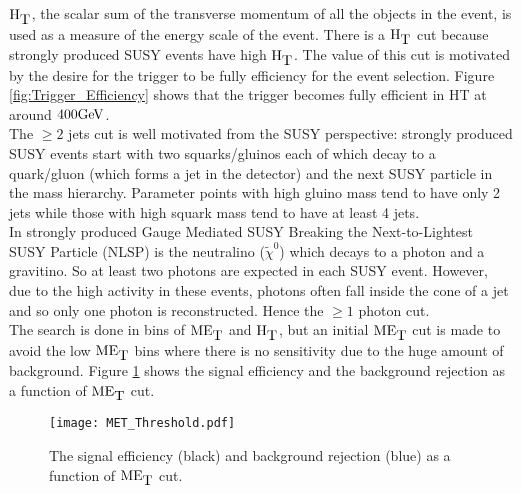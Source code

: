 $\mbox{H}_{\mbox{T}}$, the scalar sum of the transverse momentum of all the objects in the 
event, is used as a measure of the energy scale of the event. There is a $\mbox{H}_{\mbox{T}}$ 
cut because strongly produced SUSY events have high $\mbox{H}_{\mbox{T}}$. The value of this cut
is motivated by the desire for the trigger to be fully efficiency for the event
selection. Figure \ref{fig:Trigger_Efficiency} shows that the trigger becomes
fully efficient in HT at around $400\mbox{GeV}$. \\

The $\geq 2$ jets cut is well motivated from the SUSY perspective: strongly
produced SUSY events start with two squarks/gluinos each of which decay to a 
quark/gluon (which forms a jet in the detector) and the next SUSY particle in 
the mass hierarchy. Parameter points with high gluino mass tend to have only 2 
jets while those with high squark mass tend to have at least 4 jets. \\

In strongly produced Gauge Mediated SUSY Breaking the Next-to-Lightest SUSY 
Particle (NLSP) is the neutralino ($\tilde{\chi}^{0}$) which decays to a photon and 
a gravitino. So at least two photons are expected in each SUSY event. However, 
due to the high activity in these events, photons often fall inside the cone of
a jet and so only one photon is reconstructed. Hence the $\geq 1$ photon cut. \\

The search is done in bins of $\mbox{ME}_{\mbox{T}}$ and $\mbox{H}_{\mbox{T}}$, but an initial $\mbox{ME}_{\mbox{T}}$ cut is
made to avoid the low $\mbox{ME}_{\mbox{T}}$ bins where there is no sensitivity due to the huge
amount of background. Figure \ref{fig:met_threshold} shows the signal efficiency
and the background rejection as a function of $\mbox{ME}_{\mbox{T}}$ cut.

\begin{figure}
\begin{center}
\texttt{[image: MET\_Threshold.pdf]}
\end{center}
\caption{The signal efficiency (black) and background rejection (blue) as a
function of $\mbox{ME}_{\mbox{T}}$ cut.}
\label{fig:met_threshold}
\end{figure}
